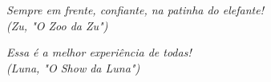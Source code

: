 %

\begin{epigrafe}
	\vspace*{\fill}
	\begin{flushright}
		\textit{Sempre em frente, confiante, na patinha do elefante!\\
			(Zu, "O Zoo da Zu")}\\
		
		\vspace{3cm}
				
		\textit{Essa é a melhor experiência de todas!\\
			(Luna, "O Show da Luna")}
	\end{flushright}	
\end{epigrafe}
